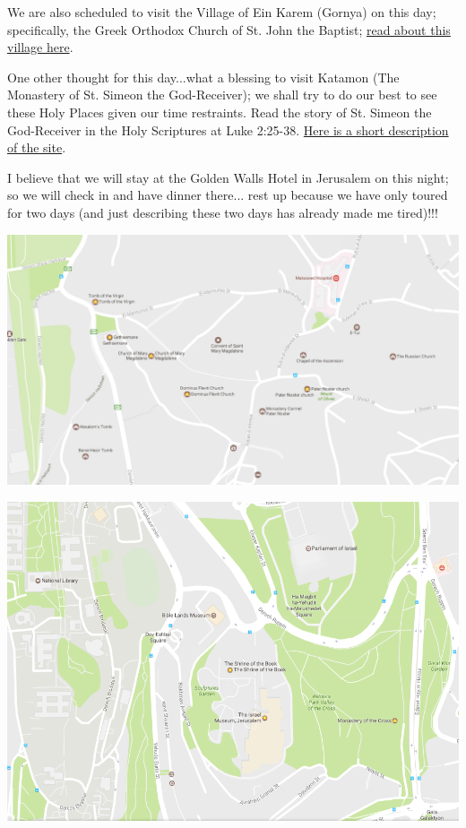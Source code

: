 \documentclass[letterpaper]{report}
\begin{document}
We are also scheduled to visit the Village of Ein Karem (Gornya)
on this day;
specifically, the Greek Orthodox Church of St. John the Baptist;
\href{https://www.holyland-pilgrimage.org/ein-karem-home-of-john-the-baptist-and-place-of-the-visitation}{read about this village here}.

One other thought for this day...what a blessing to visit Katamon
(The Monastery of St. Simeon the God-Receiver);
we shall try to do our best to see these Holy Places given our time
restraints.
Read the story of St. Simeon the God-Receiver in the Holy Scriptures at
Luke 2:25-38.
\href{http://www.goisrael.com/Tourism_Eng/Tourist%20Information/Christian%20Themes/Details/Pages/St.%20Simeon%E2%80%99s%20Monastery%20chr.aspx}
	{Here is a short description of the site}.
	
I believe that we will stay at the Golden Walls Hotel in Jerusalem on this
night; so we will check in and have dinner there...
rest up because we have only toured for two days
(and just describing these two days has already made me tired)!!!

\includegraphics[width=\textwidth]{MountOfOlives}

\includegraphics[width=\textwidth]{IsraelMuseum}
\end{document}
